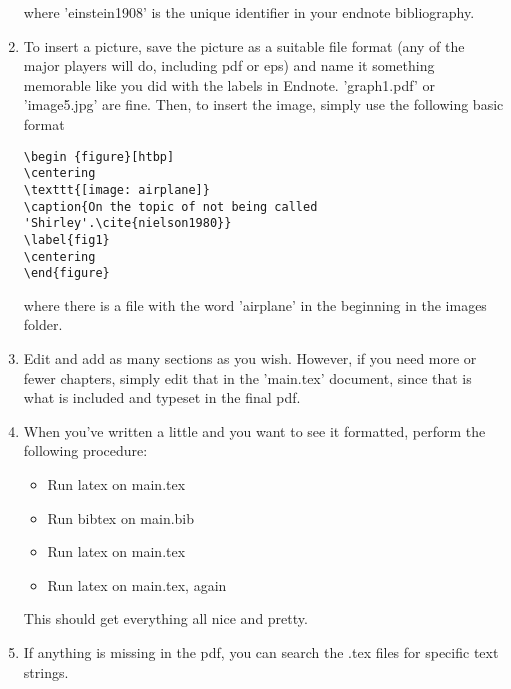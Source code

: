 \documentclass[11pt]{amsart}
\begin{document}
\begin{enumerate}
where 'einstein1908' is the unique identifier in your endnote bibliography.
\item To insert a picture, save the picture as a suitable file format (any of the major players will do, including pdf or eps) and name it something memorable like you did with the labels in Endnote. 'graph1.pdf' or 'image5.jpg' are fine. Then, to insert the image, simply use the following basic format
\begin{lstlisting}
\begin {figure}[htbp]
\centering
\texttt{[image: airplane]}
\caption{On the topic of not being called 'Shirley'.\cite{nielson1980}}
\label{fig1}
\centering
\end{figure}
\end{lstlisting}
where there is a file with the word 'airplane' in the beginning in the images folder.
\item Edit and add as many sections as you wish. However, if you need more or fewer chapters, simply edit that in the 'main.tex' document, since that is what is included and typeset in the final pdf. 
\item When you've written a little and you want to see it formatted, perform the following procedure:
\begin{itemize}
\item Run latex on main.tex
\item Run bibtex on main.bib
\item Run latex on main.tex
\item Run latex on main.tex, again
\end{itemize}
This should get everything all nice and pretty. 
\item If anything is missing in the pdf, you can search the .tex files for specific text strings. 
\end{enumerate}
\end{document}
